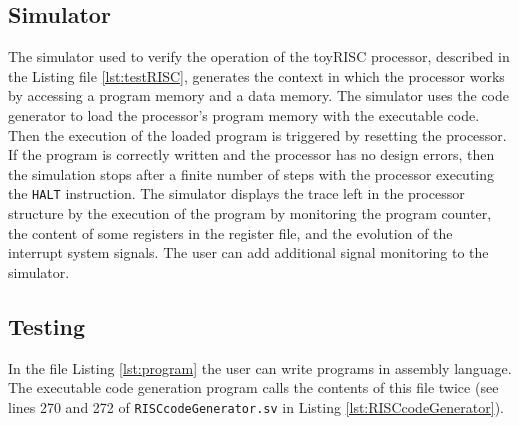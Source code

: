 \subsection{Simulator}\label{riscsim}

The simulator used to verify the operation of the toyRISC processor, described in the Listing file \ref{lst:testRISC}, generates the context in which the processor works by accessing a program memory and a data memory. The simulator uses the code generator to load the processor's program memory with the executable code. Then the execution of the loaded program is triggered by resetting the processor. If the program is correctly written and the processor has no design errors, then the simulation stops after a finite number of steps with the processor executing the {\tt HALT} instruction. The simulator displays the trace left in the processor structure by the execution of the program by monitoring the program counter, the content of some registers in the register file, and the evolution of the interrupt system signals. The user can add additional signal monitoring to the simulator.





\subsection{Testing}

In the file Listing \ref{lst:program} the user can write programs in assembly language. The executable code generation program calls the contents of this file twice (see lines 270 and 272 of {\tt RISCcodeGenerator.sv} in Listing \ref{lst:RISCcodeGenerator}).


